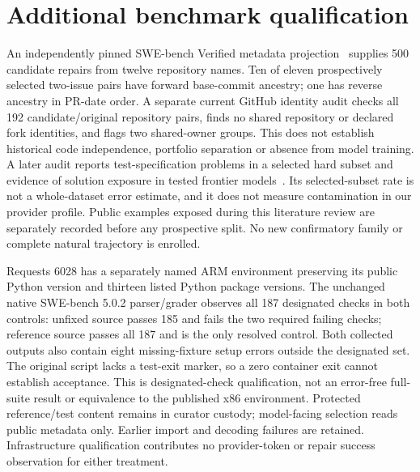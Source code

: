 \section{Additional benchmark qualification}
\label{sec:incremental-recruitment}
An independently pinned SWE-bench Verified metadata projection~\citep{swebench2024,swebenchverified2024} supplies 500
candidate repairs from twelve repository names. Ten of eleven prospectively
selected two-issue pairs have forward base-commit ancestry; one has reverse
ancestry in PR-date order. A separate current GitHub identity audit checks all
192 candidate/original repository pairs, finds no shared repository or declared
fork identities, and flags two shared-owner groups. This does not establish
historical code independence, portfolio separation or absence from model
training. A later audit reports test-specification problems in a selected hard
subset and evidence of solution exposure in tested frontier models~\citep{swebenchverifiedaudit2026}.
Its selected-subset rate is not a whole-dataset error estimate, and it does not
measure contamination in our provider profile. Public examples exposed during
this literature review are separately recorded before any prospective split.
No new confirmatory family or complete natural trajectory is enrolled.

Requests 6028 has a separately named ARM environment preserving its
public Python version and thirteen listed Python package versions. The unchanged
native SWE-bench 5.0.2 parser/grader observes all 187 designated checks in both
controls: unfixed source passes 185 and fails the two required failing checks;
reference source passes all 187 and is the only resolved control. Both collected
outputs also contain eight missing-fixture setup errors outside the designated
set. The original script lacks a test-exit marker, so a zero container exit
cannot establish acceptance. This is designated-check qualification, not an
error-free full-suite result or equivalence to the published x86 environment.
Protected reference/test content remains in curator custody; model-facing
selection reads public metadata only. Earlier import and decoding failures are
retained. Infrastructure qualification contributes no provider-token or repair
success observation for either treatment.

